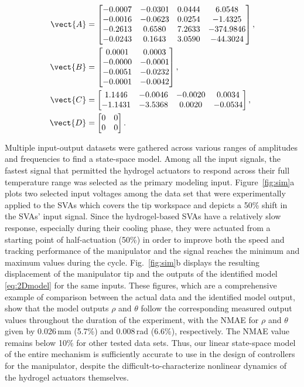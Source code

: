\begin{align*}
\vect{A} &=\begin{bmatrix} 
   -0.0007 &  -0.0301  &  0.0444 &   6.0548\\
   -0.0016 &  -0.0623  &  0.0254 &  -1.4325\\
   -0.2613  &  0.6580  &  7.2633 &-374.9846\\
   -0.0243  &  0.1643  &  3.0590 & -44.3024
    \end{bmatrix},\\
\vect{B} &=\begin{bmatrix}
    0.0001 &   0.0003\\
   -0.0000 &  -0.0001\\
   -0.0051 &  -0.0232\\
   -0.0001 &  -0.0042\\
    \end{bmatrix},\\
\vect{C} &=\begin{bmatrix}  
 1.1446  & -0.0046  & -0.0020  &  0.0034\\
-1.1431  & -3.5368  &  0.0020 &  -0.0534
    \end{bmatrix},\\
\vect{D} &=\begin{bmatrix}
     0  &   0\\
     0  &   0
    \end{bmatrix}.
\end{align*}
 
Multiple input-output datasets were gathered across various ranges of amplitudes and frequencies to find a state-space model. Among all the input signals, the fastest signal that permitted the hydrogel actuators to respond across their full temperature range was selected as the primary modeling input. Figure~\ref{fig:sim}a plots two selected input voltages among the data set that were experimentally applied to the SVAs which covers the tip workspace and depicts a 50\%  shift in the SVAs' input signal. Since the hydrogel-based SVAs have a relatively slow response, especially during their cooling phase, they were actuated from a starting point of half-actuation (50\%) in order to improve both the speed and tracking performance of the manipulator and the signal reaches the minimum and maximum values during the cycle. Fig.~\ref{fig:sim}b displays the resulting displacement of the manipulator tip and the outputs of the identified model \eqref{eq:2Dmodel} for the same inputs. These figures, which are a comprehensive example of comparison between the actual data and the identified model output, show that the model outputs $\rho$ and $\theta$ follow the corresponding measured output values throughout the duration of the experiment, with the NMAE for $\rho$ and $\theta$ given by 0.026\,mm (5.7\%) and 0.008\,rad (6.6\%), respectively. The NMAE value remains below 10\% for other tested data sets. Thus, our linear state-space model of the entire mechanism is sufficiently accurate to use in the design of controllers for the manipulator, despite the difficult-to-characterize nonlinear dynamics of the hydrogel actuators themselves.


